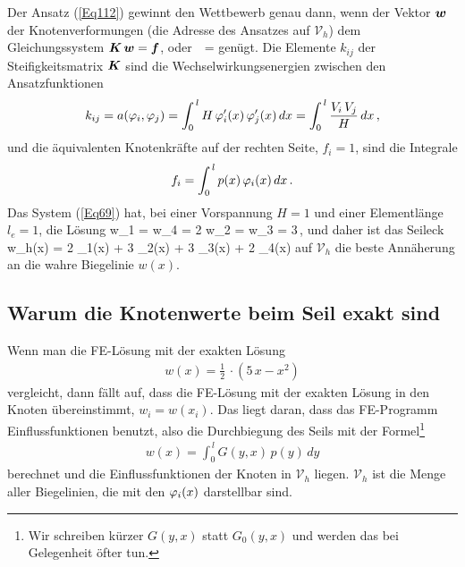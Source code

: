 Der Ansatz (\ref{Eq112}) gewinnt den Wettbewerb genau dann, wenn der Vektor $\mbox{\boldmath $w$}$ der Knotenverformungen (die \glq Adresse\grq{} des Ansatzes auf $\mathcal{V}_h$) dem Gleichungssystem $\mbox{\boldmath $K$}\,\mbox{\boldmath $w$} = \mbox{\boldmath $f$}$, oder
\beq\label{Eq69}
 \,  
\, = 
\eeq
gen\"{u}gt. Die Elemente $k_{ij}$ der Steifigkeitsmatrix $\mbox{\boldmath $K$}$ sind die Wechselwirkungsenergien zwischen den Ansatzfunktionen
\begin{align}
k_{ij} = a(\varphi_i,\varphi_j) = \int_0^{\,l} H\,\varphi_i'(x)\,\varphi_j'(x)\,dx = \int_0^{\,l} \frac{V_i\,V_j}{H}\,dx\,,
\end{align}
und die \"{a}quivalenten Knotenkr\"{a}fte auf der rechten Seite, $f_i = 1$, sind die Integrale
\begin{align}
f_i = \int_0^{\,l} p(x)\,\varphi_i(x)\,dx\, .
\end{align}
Das System (\ref{Eq69}) hat, bei einer Vorspannung $H = 1$ und einer Elementl\"{a}nge $l_e = 1$, die L\"{o}sung
\beq
w_1 = w_4 = 2 \qquad w_2 = w_3 =  3\,,
\eeq
und daher ist das Seileck
\beq\label{A11Resultat}
w_h(x) = 2 \cdot  \Np_1(x) + 3 \cdot \Np_2(x) + 3 \cdot \Np_3(x) + 2 \cdot \Np_4(x)
\eeq
auf $\mathcal{V}_h$ die beste Ann\"{a}herung  an die wahre Biegelinie $w(x)$.


{\textcolor{sectionTitleBlue}{\section{Warum die Knotenwerte beim Seil exakt sind}}}
Wenn man die FE-L\"{o}sung mit der exakten L\"{o}sung
\begin{align}
w(x) = \frac{1}{2}\,\cdot (5\,x - x^2)
\end{align}
vergleicht, dann f\"{a}llt auf, dass die FE-L\"{o}sung mit der exakten L\"{o}sung in den Knoten \"{u}bereinstimmt, $w_i = w(x_i)$. Das  liegt daran, dass das FE-Programm Einflussfunktionen benutzt, also die Durchbiegung des Seils mit der Formel\footnote{Wir schreiben k\"{u}rzer $G(y,x)$ statt $G_0(y,x)$ und werden das bei Gelegenheit \"{o}fter tun.}
\begin{align}
w(x) = \int_0^{\,l} G(y,x)\,p(y)\,dy
\end{align}
berechnet und die Einflussfunktionen der Knoten in $\mathcal{V}_h$ liegen. $\mathcal{V}_h$ ist die Menge aller Biegelinien, die mit den $\varphi_i(x)$ darstellbar sind.

